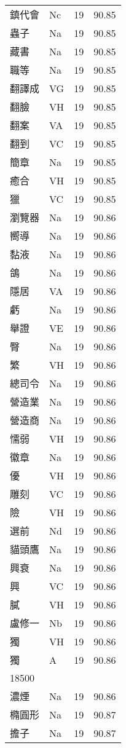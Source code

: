 \documentclass[twocolumn]{book}
\begin{document}
\begin{supertabular}{llrr}
鎮代會 & Nc & 19 &  90.85\\
蟲子 & Na & 19 &  90.85\\
藏書 & Na & 19 &  90.85\\
職等 & Na & 19 &  90.85\\
翻譯成 & VG & 19 &  90.85\\
翻臉 & VH & 19 &  90.85\\
翻案 & VA & 19 &  90.85\\
翻到 & VC & 19 &  90.85\\
簡章 & Na & 19 &  90.85\\
癒合 & VH & 19 &  90.85\\
獵 & VC & 19 &  90.85\\
瀏覽器 & Na & 19 &  90.86\\
嚮導 & Na & 19 &  90.86\\
黏液 & Na & 19 &  90.86\\
鴿 & Na & 19 &  90.86\\
隱居 & VA & 19 &  90.86\\
虧 & Na & 19 &  90.86\\
舉證 & VE & 19 &  90.86\\
臀 & Na & 19 &  90.86\\
繁 & VH & 19 &  90.86\\
總司令 & Na & 19 &  90.86\\
營造業 & Na & 19 &  90.86\\
營造商 & Na & 19 &  90.86\\
懦弱 & VH & 19 &  90.86\\
徽章 & Na & 19 &  90.86\\
優 & VH & 19 &  90.86\\
雕刻 & VC & 19 &  90.86\\
險 & VH & 19 &  90.86\\
選前 & Nd & 19 &  90.86\\
貓頭鷹 & Na & 19 &  90.86\\
興衰 & Na & 19 &  90.86\\
興 & VC & 19 &  90.86\\
膩 & VH & 19 &  90.86\\
盧修一 & Nb & 19 &  90.86\\
獨 & VH & 19 &  90.86\\
獨 & A & 19 &  90.86\\
18500\\
濃煙 & Na & 19 &  90.86\\
橢圓形 & Na & 19 &  90.87\\
擔子 & Na & 19 &  90.87\\

\end{supertabular}
\end{document}
